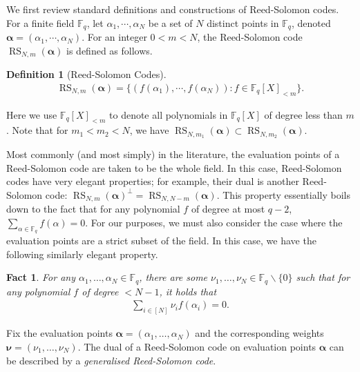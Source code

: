 \documentclass[11pt]{article}
\newtheorem{definition}[theorem]{Definition}
\newtheorem{fact}[theorem]{Fact}
\theoremstyle{definition}
\newcommand{\bigN}{N}
\newcommand{\al}{\alpha}
\newcommand{\bal}{\boldsymbol{\alpha}}
\newcommand{\FF}{\mathbb{F}}
\DeclareMathOperator{\RS}{RS}
\begin{document}
We first review standard definitions and constructions of Reed-Solomon codes.     
For a finite field $\FF_q$, let $\alpha_1, \cdots, \alpha_{\bigN}$ be a set of $\bigN$ distinct points in $\FF_q$, denoted $\bal = (\al_1, \cdots, \al_{\bigN})$.
For an integer $0< m < \bigN$, the Reed-Solomon code $\RS_{\bigN,m}(\bal)$ is defined as follows.

\begin{definition}[Reed-Solomon Codes]
    \begin{align}
        \RS_{\bigN,m}(\bal) = \{(f(\alpha_1), \cdots, f(\al_{\bigN})): f\in \FF_q[X]_{<m}\}.
    \end{align}
\end{definition}
Here we use $\FF_q[X]_{<m}$ to denote all polynomials in $\FF_q[X]$ of degree less than $m$. 
Note that for $m_1 < m_2< \bigN$, we have $\RS_{\bigN,m_1}(\bal) \subset \RS_{\bigN,m_2}(\bal)$. 


Most commonly (and most simply) in the literature, the evaluation points of a Reed-Solomon code are taken to be the whole field. 
In this case, Reed-Solomon codes have very elegant properties; for example, their dual is another Reed-Solomon code: $\RS_{\bigN,m}(\bal)^\perp = \RS_{\bigN,\bigN-m}(\bal)$. 
This property essentially boils down to the fact that for any polynomial $f$ of degree at most $q-2$, $\sum_{\alpha \in \FF_q} f(\alpha) = 0$. For our purposes, we must also consider the case where the evaluation points are a strict subset of the field. In this case, we have the following similarly elegant property.

\begin{fact} \label{fact:GRS-coeff} 
    For any $\alpha_1, \dots, \alpha_{\bigN} \in \FF_q$, there are some $\nu_1, \dots, \nu_{\bigN} \in \FF_q \backslash \{ 0 \}$ such that for any polynomial $f$ of degree $< \bigN-1$, it holds that
    \begin{align}
        \sum_{i \in [\bigN]} \nu_i f(\alpha_i) = 0.
    \end{align}
\end{fact}

Fix the evaluation points $\bal = (\alpha_1, \dots, \alpha_{\bigN})$ and the corresponding weights $\mathbf{\nu} = (\nu_1, \dots, \nu_{\bigN})$. The dual of a Reed-Solomon code on evaluation points $\bal$ can be described by a \emph{generalised Reed-Solomon code}.
\end{document}

